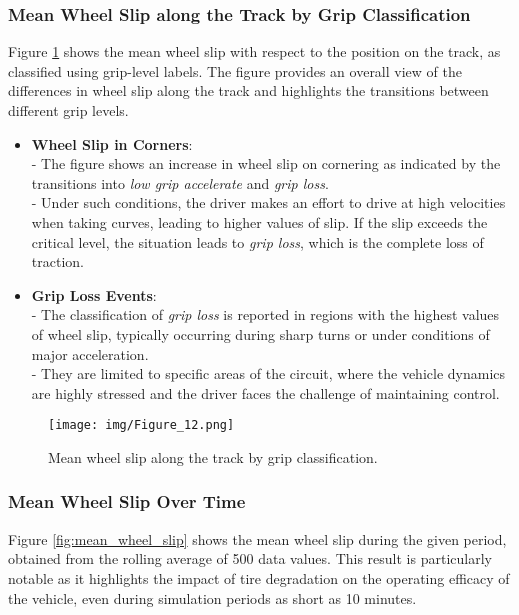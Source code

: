 \documentclass[a4paper,final,12pt]{report}
\begin{document}
\subsubsection{Mean Wheel Slip along the Track by Grip Classification}
Figure \ref{fig:mean_wheel_slip_grip_classification} shows the mean wheel slip with respect to the position on the track, as classified using grip-level labels. The figure provides an overall view of the differences in wheel slip along the track and highlights the transitions between different grip levels.

\begin{itemize}
    \item \textbf{Wheel Slip in Corners}:\\
    - The figure shows an increase in wheel slip on cornering as indicated by the transitions into \textit{low grip accelerate} and \textit{grip loss}.\\
    - Under such conditions, the driver makes an effort to drive at high velocities when taking curves, leading to higher values of slip. If the slip exceeds the critical level, the situation leads to \textit{grip loss}, which is the complete loss of traction.

    \item \textbf{Grip Loss Events}:\\
    - The classification of \textit{grip loss} is reported in regions with the highest values of wheel slip, typically occurring during sharp turns or under conditions of major acceleration.\\
    - They are limited to specific areas of the circuit, where the vehicle dynamics are highly stressed and the driver faces the challenge of maintaining control.
\end{itemize}
\begin{figure}[H]
    \centering
    \texttt{[image: img/Figure\_12.png]}
    \caption{Mean wheel slip along the track by grip classification.}
    \label{fig:mean_wheel_slip_grip_classification}
\end{figure}

\subsubsection{Mean Wheel Slip Over Time}
Figure \ref{fig:mean_wheel_slip} shows the mean wheel slip during the given period, obtained from the rolling average of 500 data values. This result is particularly notable as it highlights the impact of tire degradation on the operating efficacy of the vehicle, even during simulation periods as short as 10 minutes.
\end{document}
